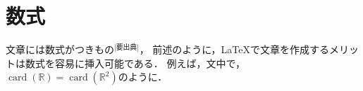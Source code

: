 \documentclass[a4j, dvipdfmx]{jsarticle}
\begin{document}
\section{数式}
  文章には数式がつきもの$^\text{[要出典]}$，
  前述のように，\LaTeX で文章を作成するメリットは数式を容易に挿入可能である．
  例えば，文中で，
  $\operatorname{card}(\mathbb{R}) = \operatorname{card}(\mathbb{R}^2)$のように．
\end{document}
